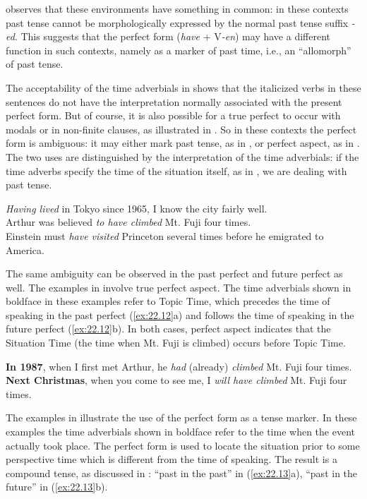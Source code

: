 \citet[101]{McCawley1971} observes that these environments have something in common: in these contexts past tense cannot be morphologically expressed by the normal past tense suffix \textit{-ed}. This suggests that the perfect form (\textit{have} + V\textit{-en}) may have a different function in such contexts, namely as a marker of past time, i.e., an “allomorph” of past tense.



The acceptability of the time adverbials in  shows that the italicized verbs in these sentences do not have the interpretation normally associated with the present perfect form. But of course, it is also possible for a true perfect to occur with modals or in non-finite clauses, as illustrated in . So in these contexts the perfect form is ambiguous: it may either mark past tense, as in , or perfect aspect, as in . The two uses are distinguished by the interpretation of the time adverbials: if the time adverbs specify the time of the situation itself, as in , we are dealing with past tense.


\newpage %
\ea \label{ex:22.11}
\ea \textit{Having lived} in Tokyo since 1965, I know the city fairly well.\\
\ex Arthur was believed \textit{to have climbed} Mt. Fuji four times.\\
\ex Einstein must \textit{have visited} Princeton several times before he emigrated to America.
                       \z
\z


The same ambiguity can be observed in the past perfect and future perfect as well. The examples in  involve true perfect aspect. The time adverbials shown in boldface in these examples refer to Topic Time, which precedes the time of speaking in the past perfect (\ref{ex:22.12}a) and follows the time of speaking in the future perfect (\ref{ex:22.12}b). In both cases, perfect aspect indicates that the Situation Time (the time when Mt. Fuji is climbed) occurs before Topic Time.


\ea \label{ex:22.12}
\ea \textbf{In 1987}, when I first met Arthur, he \textit{had} (already) \textit{climbed} Mt. Fuji four times.\\
\ex \textbf{Next Christmas}, when you come to see me, I \textit{will have climbed} Mt. Fuji four times.
                       \z
\z


The examples in  illustrate the use of the perfect form as a tense marker. In these examples the time adverbials shown in boldface refer to the time when the event actually took place. The perfect form is used to locate the situation prior to some perspective time which is different from the time of speaking. The result is a compound tense, as discussed in : “past in the past” in (\ref{ex:22.13}a), “past in the future” in (\ref{ex:22.13}b).


